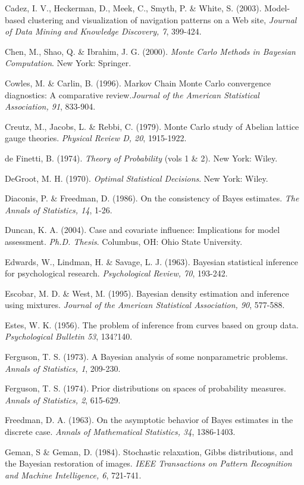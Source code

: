 \documentclass[authoryear]{elsarticle}
\begin{document}
\begin{list}{}{\setlength{\leftmargin}{12pt}\setlength{\itemindent}{-12pt}\setlength{\parsep}{0pt}}
\item Cadez, I. V., Heckerman, D., Meek, C., Smyth, P. \& White, S. (2003). Model-based clustering and visualization of navigation patterns on a Web site, {\it Journal of Data Mining and Knowledge Discovery, 7}, 399-424.
\item Chen, M., Shao, Q. \& Ibrahim, J. G. (2000). {\it Monte Carlo Methods in Bayesian Computation}. New York: Springer.
\item Cowles, M. \& Carlin, B. (1996). Markov Chain Monte Carlo convergence diagnostics: A comparative review.{\it Journal of the American Statistical Association, 91}, 833-904.
\item Creutz, M., Jacobs, L. \& Rebbi, C. (1979). Monte Carlo study of Abelian lattice gauge theories. {\it Physical Review D, 20}, 1915-1922.
\item de Finetti, B. (1974). {\it Theory of Probability} (vols 1 \& 2). New York: Wiley.
\item DeGroot, M. H. (1970). {\it Optimal Statistical Decisions}. New York: Wiley.
\item Diaconis, P. \& Freedman, D. (1986). On the consistency of Bayes estimates. {\it The Annals of Statistics, 14}, 1-26.
\item Duncan, K. A. (2004). Case and covariate influence: Implications for model assessment.  {\it Ph.D. Thesis}. Columbus, OH: Ohio State University.
\item Edwards, W., Lindman, H. \& Savage, L. J. (1963). Bayesian statistical inference for psychological research. {\it Psychological Review, 70}, 193-242.
\item Escobar, M. D. \& West, M. (1995). Bayesian density estimation and inference using mixtures. {\it Journal of the American Statistical Association, 90}, 577-588.
\item Estes, W. K. (1956). The problem of inference from curves based on group data. {\it Psychological Bulletin 53}, 134?140.
\item Ferguson, T. S. (1973). A Bayesian analysis of some nonparametric problems. {\it Annals of Statistics, 1}, 209-230.
\item Ferguson, T. S. (1974). Prior distributions on spaces of probability measures. {\it Annals of Statistics, 2}, 615-629.
\item Freedman, D. A. (1963). On the asymptotic behavior of Bayes estimates in the discrete case. {\it Annals of Mathematical Statistics, 34}, 1386-1403.
\item Geman, S \& Geman, D. (1984). Stochastic relaxation, Gibbs distributions, and the Bayesian restoration of images. {\it IEEE Transactions on Pattern Recognition and Machine Intelligence, 6}, 721-741.

\end{list}
\end{document}
